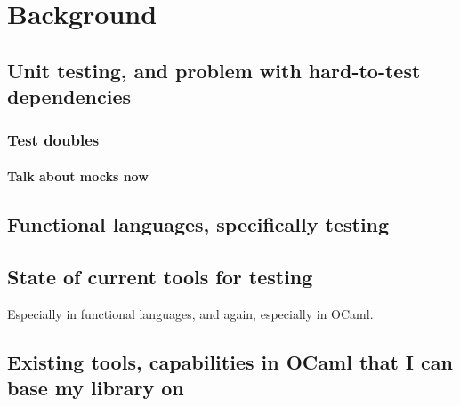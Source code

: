\chapter{Background}
\label{background}

\section{Unit testing, and problem with hard-to-test dependencies}

\subsection{Test doubles}
\label{testdoubles}


\subsubsection{Talk about mocks now}
\label{testdoubles:mocks}

\section{Functional languages, specifically testing}

\section{State of current tools for testing}

Especially in functional languages, and again, especially in OCaml.

\section{Existing tools, capabilities in OCaml that I can base my library on}

